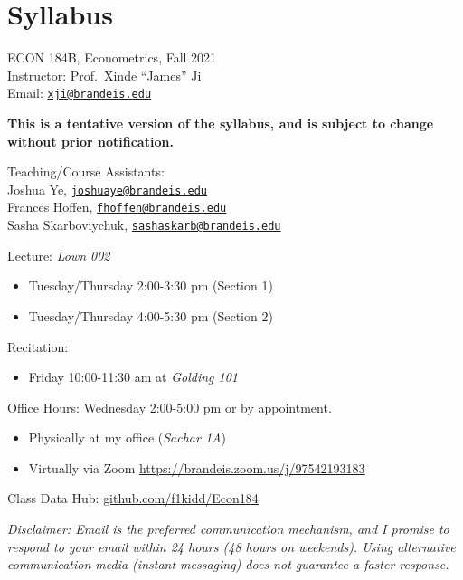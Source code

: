 \documentclass[
]{article}
\author{}
\date{}
\providecommand{\tightlist}{%
  \setlength{\itemsep}{0pt}\setlength{\parskip}{0pt}}
\begin{document}
\hypertarget{syllabus}{%
\section{Syllabus}\label{syllabus}}

ECON 184B, Econometrics, Fall 2021\\
Instructor: Prof.~Xinde ``James'' Ji\\
Email: \href{mailto:xji@brandeis.edu}{\nolinkurl{xji@brandeis.edu}}

\textbf{This is a tentative version of the syllabus, and is subject to
change without prior notification.}

Teaching/Course Assistants:\\
Joshua Ye,
\href{mailto:joshuaye@brandeis.edu}{\nolinkurl{joshuaye@brandeis.edu}}\\
Frances Hoffen,
\href{mailto:fhoffen@brandeis.edu}{\nolinkurl{fhoffen@brandeis.edu}}\\
Sasha Skarboviychuk,
\href{mailto:sashaskarb@brandeis.edu}{\nolinkurl{sashaskarb@brandeis.edu}}

Lecture: \emph{Lown 002}

\begin{itemize}
\tightlist
\item
  Tuesday/Thursday 2:00-3:30 pm (Section 1)
\item
  Tuesday/Thursday 4:00-5:30 pm (Section 2)
\end{itemize}

Recitation:

\begin{itemize}
\tightlist
\item
  Friday 10:00-11:30 am at \emph{Golding 101}
\end{itemize}

Office Hours: Wednesday 2:00-5:00 pm or by appointment.

\begin{itemize}
\tightlist
\item
  Physically at my office (\emph{Sachar 1A})
\item
  Virtually via Zoom \url{https://brandeis.zoom.us/j/97542193183}
\end{itemize}

Class Data Hub:
\href{https://github.com/f1kidd/Econ184}{github.com/f1kidd/Econ184}

\emph{Disclaimer: Email is the preferred communication mechanism, and I
promise to respond to your email within 24 hours (48 hours on weekends).
Using alternative communication media (instant messaging) does not
guarantee a faster response.}
\end{document}
